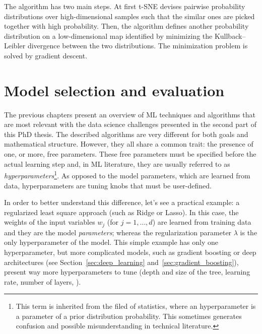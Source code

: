 	The algorithm has two main steps. At first t-SNE devises pairwise probability distributions over high-dimensional samples such that the similar ones are picked together with high probability. Then, the algorithm defines another probability distribution on a low-dimensional map identified by minimizing the Kullback–Leibler divergence between the two distributions. The minimization problem is solved by gradient descent. 
    

  \section{Model selection and evaluation} \label{subsec:model_selection}
  
  The previous chapters present an overview of ML techniques and algorithms that are most relevant with the data science challenges presented in the second part of this PhD thesis.
  The described algorithms are very different for both goals and mathematical structure.
  However, they all share a common trait: the presence of one, or more, free parameters.
  These free parameters must be specified before the actual learning step and, in ML literature, they are usually referred to as \textit{hyperparameters}\footnote{ This term is inherited from the filed of statistics, where an hyperparameter is a parameter of a prior distribution probability. This sometimes generates confusion and possible misunderstanding in technical literature.}.
  As opposed to the model parameters, which are learned from data, hyperparameters are tuning knobs that must be user-defined.
  
  In order to better understand this difference, let's see a practical example: a regularized least square approach (such as Ridge or Lasso).
  In this case, the weights of the input variables $w_j$ (for $j=1,\dots,d$) are learned from training data and they are the model \textit{parameters}; whereas the regularization parameter $\lambda$ is the only hyperparameter of the model.
  This simple example has only one hyperparameter, but more complicated models, such as gradient boosting or deep architectures (see Section~\ref{sec:deep_learning} and~\ref{sec:gradient_boosting}), present way more hyperparameters to tune (\eg depth and size of the tree, learning rate, number of layers, \etc).
  
